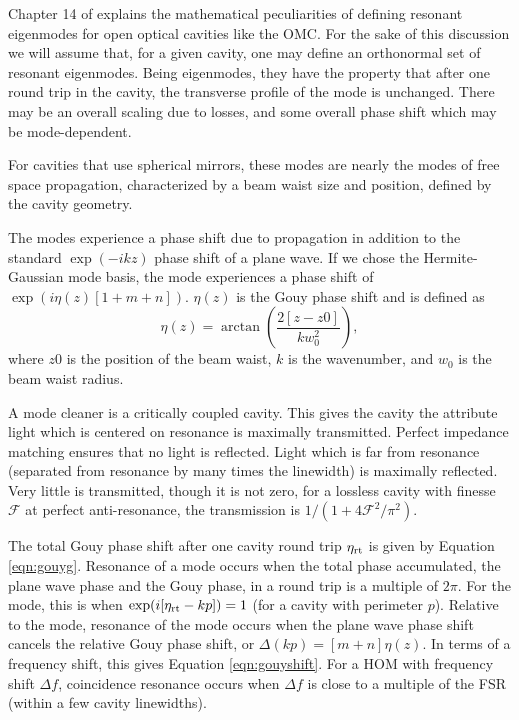 Chapter 14 of \citet{Siegman} explains the mathematical peculiarities of defining resonant eigenmodes for open optical cavities like the OMC. %
For the sake of this discussion we will assume that, for a given cavity, one may define an orthonormal set of resonant eigenmodes. %
Being eigenmodes, they have the property that after one round trip in the cavity, the transverse profile of the mode is unchanged. %
There may be an overall scaling due to losses, and some overall phase shift which may be mode-dependent. %


For cavities that use spherical mirrors, these modes are nearly the \TEM{} modes of free space propagation, characterized by a beam waist size and position, defined by the cavity geometry.

The modes experience a phase shift due to propagation in addition to the standard $\exp(-ikz)$ phase shift of a plane wave. %
If we chose the Hermite-Gaussian mode basis, the  mode experiences a phase shift of $\exp(i\eta(z)[1+m+n])$. %
$\eta(z)$ is the Gouy phase shift and is defined as
\begin{equation}
\eta(z) = \arctan\left(\frac{2[z-z0]}{kw_0^2}\right),
\end{equation}
where $z0$ is the position of the beam waist, $k$ is the wavenumber, and $w_0$ is the beam waist radius.

A mode cleaner is a critically coupled cavity. %
This gives the cavity the attribute light which is centered on resonance is maximally transmitted. %
Perfect impedance matching ensures that no light is reflected. %
Light which is far from resonance (separated from resonance by many times the linewidth) is maximally reflected. %
Very little is transmitted, though it is not zero, for a lossless cavity with finesse $\mathcal{F}$ at perfect anti-resonance, the transmission is $1/(1+4\mathcal{F}^2/\pi^2)$.

The total Gouy phase shift after one cavity round trip $\eta_{\rm{rt}}$ is given by Equation \ref{eqn:gouyg}. %
Resonance of a mode occurs when the total phase accumulated, the plane wave phase and the Gouy phase, in a round trip is a multiple of $2\pi$. %
For the  mode, this is when $\exp(i[\eta_{\rm{rt}}-kp])=1$ (for a cavity with perimeter $p$). %
Relative to the  mode, resonance of the  mode occurs when the plane wave phase shift cancels the relative Gouy phase shift, or $\Delta(kp)=[m+n]\eta(z)$. %
In terms of a frequency shift, this gives Equation \ref{eqn:gouyshift}. %
For a HOM with frequency shift $\Delta f$, coincidence resonance occurs when $\Delta f$ is close to a multiple of the FSR (within a few cavity linewidths).

